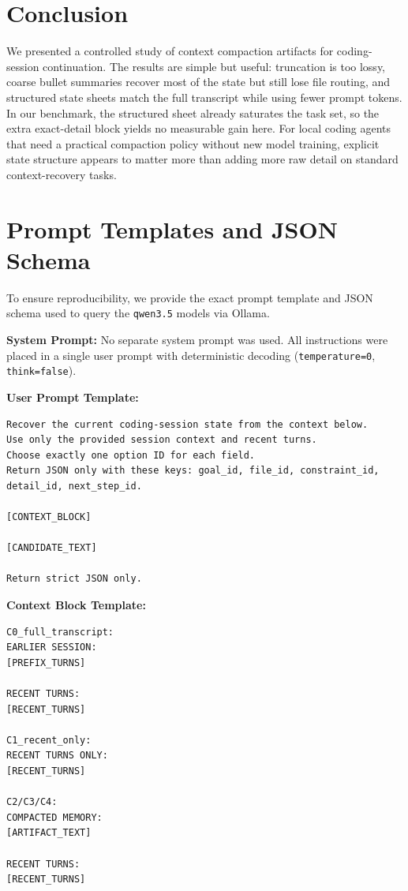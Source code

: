 \documentclass[11pt]{article}
\begin{document}
\section{Conclusion}
We presented a controlled study of context compaction artifacts for coding-session continuation. The results are simple but useful: truncation is too lossy, coarse bullet summaries recover most of the state but still lose file routing, and structured state sheets match the full transcript while using fewer prompt tokens. In our benchmark, the structured sheet already saturates the task set, so the extra exact-detail block yields no measurable gain here. For local coding agents that need a practical compaction policy without new model training, explicit state structure appears to matter more than adding more raw detail on standard context-recovery tasks.



\appendix
\section{Prompt Templates and JSON Schema}
\label{sec:appendix_prompts}
To ensure reproducibility, we provide the exact prompt template and JSON schema used to query the \texttt{qwen3.5} models via Ollama.

\textbf{System Prompt:} No separate system prompt was used. All instructions were placed in a single user prompt with deterministic decoding (\texttt{temperature=0}, \texttt{think=false}).

\textbf{User Prompt Template:}
{\footnotesize
\begin{verbatim}
Recover the current coding-session state from the context below.
Use only the provided session context and recent turns.
Choose exactly one option ID for each field.
Return JSON only with these keys: goal_id, file_id, constraint_id,
detail_id, next_step_id.

[CONTEXT_BLOCK]

[CANDIDATE_TEXT]

Return strict JSON only.
\end{verbatim}
}

\textbf{Context Block Template:}
{\footnotesize
\begin{verbatim}
C0_full_transcript:
EARLIER SESSION:
[PREFIX_TURNS]

RECENT TURNS:
[RECENT_TURNS]

C1_recent_only:
RECENT TURNS ONLY:
[RECENT_TURNS]

C2/C3/C4:
COMPACTED MEMORY:
[ARTIFACT_TEXT]

RECENT TURNS:
[RECENT_TURNS]
\end{verbatim}
}
\end{document}
